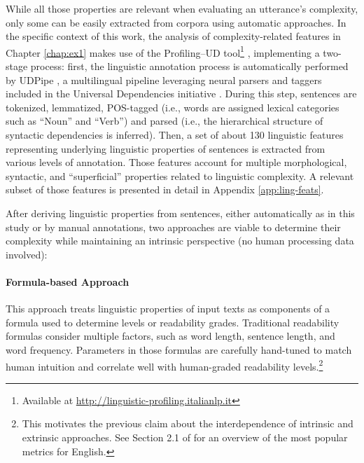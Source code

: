 \documentclass[a4paper, nobind]{templates/ociamthesis}
\begin{document}
While all those properties are relevant when evaluating an utterance's complexity, only some can be easily extracted from corpora using automatic approaches. In the specific context of this work, the analysis of complexity-related features in Chapter \ref{chap:ex1} makes use of the Profiling--UD tool\footnote{Available at \url{http://linguistic-profiling.italianlp.it}} \autocite{brunato-etal-2020-profiling}, implementing a two-stage process: first, the linguistic annotation process is automatically performed by UDPipe \autocite{straka-etal-2016-udpipe}, a multilingual pipeline leveraging neural parsers and taggers included in the Universal Dependencies initiative \autocite{nivre-etal-2016-universal}. During this step, sentences are tokenized, lemmatized, POS-tagged (i.e., words are assigned lexical categories such as ``Noun'' and ``Verb'') and parsed (i.e., the hierarchical structure of syntactic dependencies is inferred). Then, a set of about 130 linguistic features representing underlying linguistic properties of sentences is extracted from various levels of annotation. Those features account for multiple morphological, syntactic, and ``superficial'' properties related to linguistic complexity. A relevant subset of those features is presented in detail in Appendix \ref{app:ling-feats}.

After deriving linguistic properties from sentences, either automatically as in this study or by manual annotations, two approaches are viable to determine their complexity while maintaining an intrinsic perspective (no human processing data involved):

\vspace{-12pt}

\paragraph{Formula-based Approach} This approach treats linguistic properties of input texts as components of a formula used to determine levels or readability grades. Traditional readability formulas consider multiple factors, such as word length, sentence length, and word frequency. Parameters in those formulas are carefully hand-tuned to match human intuition and correlate well with human-graded readability levels.\footnote{This motivates the previous claim about the interdependence of intrinsic and extrinsic approaches. See Section 2.1 of \textcite{martinc-2019-supervised} for an overview of the most popular metrics for English.}

\vspace{-12pt}
\end{document}
